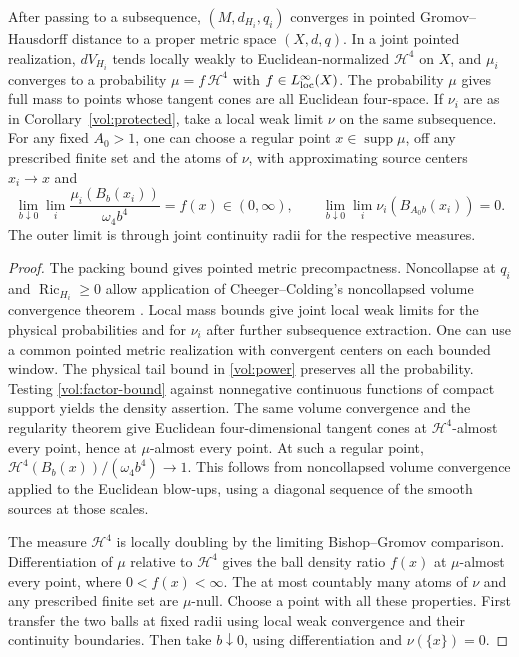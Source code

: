 \begin{theorem}
\label{vol:regular}
After passing to a subsequence, \((M,d_{H_i},q_i)\) converges
in pointed Gromov--Hausdorff distance to a proper metric space
\((X,d,q)\). In a joint pointed realization, \(dV_{H_i}\) tends
locally weakly to Euclidean-normalized \(\mathcal H^4\) on \(X\),
and \(\mu_i\) converges to a probability
\(\mu=f\,\mathcal H^4\) with \(f\in L^\infty_{\rm loc}(X)\).
The probability \(\mu\) gives full mass to points whose tangent
cones are all Euclidean four-space. If \(\nu_i\) are as in
Corollary~\ref{vol:protected}, take a local weak limit \(\nu\)
on the same subsequence. For any fixed \(A_0>1\), one can choose a
regular point \(x\in\operatorname{supp}\mu\), off any prescribed
finite set and the atoms of \(\nu\), with approximating source
centers \(x_i\to x\) and
\begin{equation}
 \lim_{b\downarrow0}\lim_i\frac{\mu_i(B_b(x_i))}{\omega_4 b^4}
      = f(x)\in(0,\infty),\qquad
 \lim_{b\downarrow0}\lim_i\nu_i(B_{A_0b}(x_i))=0 .
 \label{vol:regular-iterated}
\end{equation}
The outer limit is through joint continuity radii for the
respective measures.
\end{theorem}

\begin{proof}
The packing bound gives pointed metric precompactness.
Noncollapse at \(q_i\) and \(\operatorname{Ric}_{H_i}\geq0\)
allow application of Cheeger--Colding's noncollapsed volume
convergence theorem
\cite[Theorem 5.9]{CheegerColding1997StructureI}.
Local mass bounds give joint local weak limits for the physical
probabilities and for \(\nu_i\) after further subsequence
extraction. One can use a common pointed metric realization
with convergent centers on each bounded window. The physical
tail bound in \eqref{vol:power} preserves all the probability.
Testing \eqref{vol:factor-bound} against nonnegative continuous
functions of compact support yields the density assertion.
The same volume convergence and the regularity theorem
\cite[Theorems 2.1 and 5.11]{CheegerColding1997StructureI}
give Euclidean four-dimensional tangent cones at
\(\mathcal H^4\)-almost every point, hence at \(\mu\)-almost
every point. At such a regular point,
\(\mathcal H^4(B_b(x))/(\omega_4 b^4)\to1\).
This follows from noncollapsed volume convergence applied to
the Euclidean blow-ups, using a diagonal sequence of the
smooth sources at those scales.

The measure \(\mathcal H^4\) is locally doubling by the limiting
Bishop--Gromov comparison. Differentiation of \(\mu\) relative
to \(\mathcal H^4\) gives the ball density ratio \(f(x)\) at
\(\mu\)-almost every point, where \(0<f(x)<\infty\).
The at most countably many atoms of \(\nu\) and any prescribed
finite set are \(\mu\)-null. Choose a point with all these
properties. First transfer the two balls at fixed radii using
local weak convergence and their continuity boundaries.
Then take \(b\downarrow0\), using differentiation and
\(\nu(\{x\})=0\).
\end{proof}

